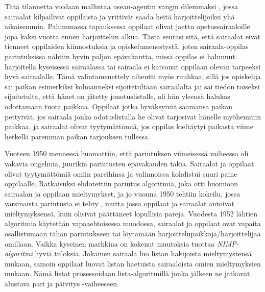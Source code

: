 \documentclass[finnish]{tktltiki2}
\theoremstyle{definition}
\theoremstyle{remark}
\begin{document}
Tätä tilannetta voidaan mallintaa usean-agentin vangin dilemmaksi \cite{roth84}, jossa sairaalat kilpailivat oppilaista ja yrittivät saada heitä harjoittelijoiksi yhä aikaisemmin. Pahimmassa tapauksessa oppilaat olivat jaettu opetussairaaloille jopa kaksi vuotta ennen harjoittelun alkua. Tästä seurasi sitä, että sairaalat eivät tienneet oppilaiden kiinnostuksia ja opiskelumenestystä, joten sairaala-oppilas pariutuksissa nähtiin hyvin paljon epävakautta, missä oppilas ei halunnut harjoitella kyseisessä sairaalassa tai sairaala ei katsonut oppilaan olevan tarpeeksi hyvä sairaalalle. Tämä valintamenettely aiheutti myös ruuhkaa, sillä jos opiskelija sai paikan esimerkiksi kolmanneksi sijoitetultaan sairaalalta jai sai tiedon toiseksi sijoitetulta, että hänet on jätetty jonotuslistalle, oli hän yleensä halukas odottamaan tuota paikkaa. Oppilaat jotka hyväksyivät saamansa paikan pettyivät, jos sairaala jonka odotuslistalla he olivat tarjosivat hänelle myöhemmin paikkaa, ja sairaalat olivat tyytymättömiä, jos oppilas kieltäytyi paikasta viime hetkellä paremman paikan tarjouksen tullessa.

Vuoteen 1950 mennessä huomattiin, että pariutuksen viimeisessä vaiheessa oli vakavia ongelmia, juurikin pariutusten epävakauden takia. Sairaalat ja oppilaat olivat tyytymättömiä omiin pareihinsa ja valinnoissa kohdistui suuri paine oppilaalle. Ratkaisuksi ehdotettiin pariutus algoritmiä, joka otti huomioon sairaalan ja oppilaan mieltymykset, ja jo vuonna 1950 tehtiin kokeilu, jossa varsinaista pariutusta ei tehty \cite{roth84}, mutta jossa oppilaat ja sairaalat antoivat mieltymyksensä, kuin olisivat päättäneet lopullisia pareja. Vuodesta 1952 lähtien algoritmia käytetään vapaaehtoisessa muodossa, sairaalat ja oppilaat ovat vapaita osallistumaan tähän pariutukseen tai löytämään harjoittelupaikkoja/harjoittelijaa omillaan. Vaikka kyseinen markkina on kokenut muutoksia tuottaa \emph{NIMP-algoritmi} hyviä tuloksia.
Jokainen sairaala luo listan hakijoista mieltymystensä mukaan, samoin oppilaat luovat listan haetuista sairaaloista omien mieltymyksien mukaan. Nämä listat prosessoidaan lista-algoritmillä jonka jälkeen ne jatkavat alustava pari ja päivitys -vaiheeseen.
\end{document}
